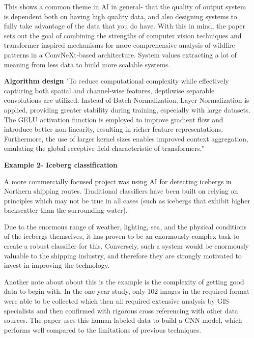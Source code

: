 \documentclass[conference,a4paper]{IEEEtran}
\begin{document}
This shows a common theme in AI in general- that the quality of output system is dependent both on having high quality data, and also  designing systems to fully take advantage of the data that you do have. With this in mind, the paper sets out the goal of combining the strengths of computer vision techniques and transformer inspired mechanisms for more comprehensive analysis of wildfire patterns in a ConvNeXt-based architecture. System values extracting a lot of meaning from less data to build more scalable systems.

\textbf{Algorithm design}
"To reduce computational complexity while effectively capturing both spatial and channel-wise features, depthwise separable convolutions are utilized. Instead of Batch Normalization, Layer Normalization is applied, providing greater stability during training, especially with large datasets. The GELU activation function is employed to improve gradient flow and introduce better non-linearity, resulting in richer feature representations. Furthermore, the use of larger kernel sizes enables improved context aggregation, emulating the global receptive field characteristic of transformers."



\textbf{Example 2- Iceberg classification}

A more commercially focused project was using AI for detecting icebergs in Northern shipping routes. Traditional classifiers have been built on relying on principles which may not be true in all cases (such as icebergs that exhibit higher backscatter than the surrounding water). 

Due to the enormous range of weather, lighting, sea,  and the physical conditions of the icebergs themselves, it has proven to be an enormously complex task to create a robust classifier for this. Conversely, such a system would be enormously valuable to the shipping industry, and therefore they are strongly motivated to invest in improving the technology.

Another note about about this is the example is the complexity of getting good data to begin with. In the one year study, only 102 images in the required format were able to be collected which then all required extensive analysis by GIS specialists and then confirmed with rigorous cross referencing with other data sources. The paper uses this human labeled data to build a CNN model, which performs well compared to the limitations of previous techniques.
\end{document}

